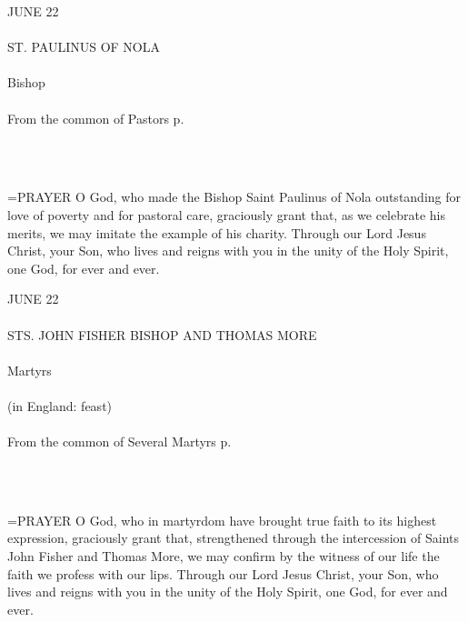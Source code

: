 \begin{center}\normalsize \begin{center}\normalsize JUNE 22\\\\
\footnotesize \footnotesize ST. PAULINUS OF NOLA\\\\
\footnotesize \footnotesize Bishop\\\\
\footnotesize \footnotesize From the common of Pastors p. \\\\
\footnotesize \end{center}\\
\end{center}

\hangindent=\parindent \small{PRAYER 
O God, who made the Bishop Saint Paulinus of Nola
outstanding for love of poverty and for pastoral care,
graciously grant that, as we celebrate his merits,
we may imitate the example of his charity.
Through our Lord Jesus Christ, your Son,
who lives and reigns with you in the unity of the Holy Spirit,
one God, for ever and ever.\\}
 
\begin{center}\normalsize \begin{center}\normalsize JUNE 22\\\\
\footnotesize \footnotesize STS. JOHN FISHER  BISHOP AND THOMAS MORE\\\\
\footnotesize \footnotesize Martyrs\\\\
\footnotesize \footnotesize (in England: feast)\\\\
\footnotesize \footnotesize From the common of Several Martyrs p. \\\\
\footnotesize \end{center}\\
\end{center}

\hangindent=\parindent \small{PRAYER 
O God, who in martyrdom
have brought true faith to its highest expression,
graciously grant
that, strengthened through the intercession
of Saints John Fisher and Thomas More,
we may confirm by the witness of our life
the faith we profess with our lips.
Through our Lord Jesus Christ, your Son,
who lives and reigns with you in the unity of the Holy Spirit,
one God, for ever and ever.\\}
 
